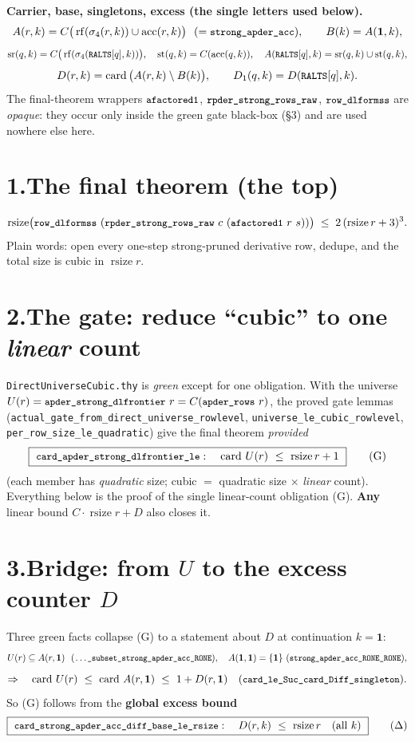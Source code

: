 \documentclass[11pt]{article}
\newcommand{\rsz}{\operatorname{rsize}}
\newcommand{\card}{\operatorname{card}}
\newcommand{\rf}{\operatorname{rf}}
\newcommand{\acc}{\operatorname{acc}}
\newcommand{\sfour}{\sigma_4}
\newcommand{\Aacc}{A}
\newcommand{\Bbase}{B}
\newcommand{\Dexc}{D}
\newcommand{\Uuniv}{U}
\newcommand{\sr}{\operatorname{sr}}
\newcommand{\st}{\operatorname{st}}
\newcommand{\one}{\mathbf{1}}
\newcommand{\code}[1]{\texttt{\small #1}}
\begin{document}
\medskip
\textbf{Carrier, base, singletons, excess (the single letters used below).}
\[
\Aacc(r,k)=C\big(\rf(\sfour(r,k))\cup\acc(r,k)\big)\ \ (=\code{strong\_apder\_acc}),\qquad \Bbase(k)=\Aacc(\one,k),
\]
\[
\sr(q,k)=C\big(\rf(\sfour(\code{RALTS}[q],k))\big),\quad \st(q,k)=C(\acc(q,k)),\quad \Aacc(\code{RALTS}[q],k)=\sr(q,k)\cup\st(q,k),
\]
\[
\Dexc(r,k)=\card\big(\Aacc(r,k)\setminus\Bbase(k)\big),\qquad \Dexc_1(q,k)=\Dexc(\code{RALTS}[q],k).
\]
The final-theorem wrappers $\code{afactored1}$, $\code{rpder\_strong\_rows\_raw}$, $\code{row\_dlformss}$ are
\emph{opaque}: they occur only inside the green gate black-box (\S3) and are used nowhere else here.

\section*{1.\quad The final theorem (the top)}
\[
\rsz\!\big(\code{row\_dlformss}\ (\code{rpder\_strong\_rows\_raw}\ c\ (\code{afactored1}\ r\ s))\big)\;\le\;2\,(\rsz r+3)^3 .
\]
Plain words: open every one-step strong-pruned derivative row, dedupe, and the total size is cubic in $\rsz r$.

\section*{2.\quad The gate: reduce ``cubic'' to one \emph{linear} count}
\code{DirectUniverseCubic.thy} is \emph{green} except for one obligation. With the universe
$\Uuniv(r)=\code{apder\_strong\_dlfrontier}\ r=C(\code{apder\_rows}\ r)$, the proved gate lemmas
(\code{actual\_gate\_from\_direct\_universe\_rowlevel}, \code{universe\_le\_cubic\_rowlevel},
\code{per\_row\_size\_le\_quadratic}) give the final theorem \emph{provided}
\[
\boxed{\ \code{card\_apder\_strong\_dlfrontier\_le}:\quad \card\,\Uuniv(r)\ \le\ \rsz r+1\ }\tag{G}
\]
(each member has \emph{quadratic} size; cubic $=$ quadratic size $\times$ \emph{linear} count). Everything below
is the proof of the single linear-count obligation (G). \textbf{Any} linear bound $C\!\cdot\!\rsz r+D$ also closes it.

\section*{3.\quad Bridge: from $\Uuniv$ to the excess counter $\Dexc$}
Three green facts collapse (G) to a statement about $\Dexc$ at continuation $k=\one$:
\[
\Uuniv(r)\subseteq \Aacc(r,\one)\ \ (\code{\dots\_subset\_strong\_apder\_acc\_RONE}),\quad
\Aacc(\one,\one)=\{\one\}\ (\code{strong\_apder\_acc\_RONE\_RONE}),
\]
\[
\Rightarrow\quad \card\,\Uuniv(r)\ \le\ \card\,\Aacc(r,\one)\ \le\ 1+\Dexc(r,\one)
\quad(\code{card\_le\_Suc\_card\_Diff\_singleton}).
\]
So (G) follows from the \textbf{global excess bound}
\[
\boxed{\ \code{card\_strong\_apder\_acc\_diff\_base\_le\_rsize}:\quad \Dexc(r,k)\ \le\ \rsz r\quad\text{(all }k\text{)}\ }\tag{$\Delta$}
\]
\end{document}
